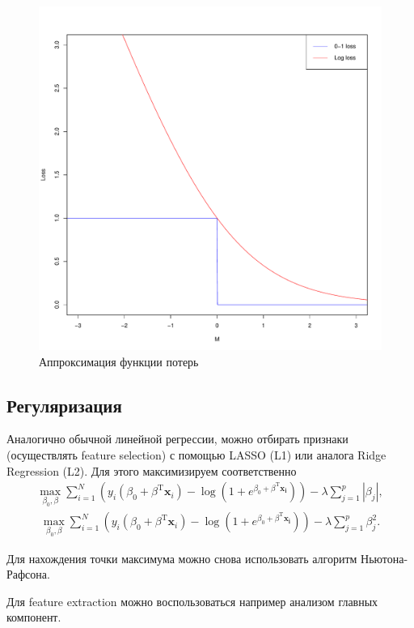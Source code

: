\documentclass{article}
\begin{document}
\begin{figure}[h]
  \begin{center}
  \includegraphics[width=0.8\linewidth]{LogLoss.pdf}
\end{center}
  \caption{Аппроксимация функции потерь}
  \label{fig:LogLoss}
\end{figure}

\subsection{Регуляризация}
Аналогично обычной линейной регрессии, можно отбирать признаки (осуществлять feature selection) с помощью LASSO (L1) или аналога Ridge Regression (L2). Для этого максимизируем соответственно
\begin{align*}
  \max_{\beta_0, \beta} \sum\limits_{i = 1}^N \left( y_i(\beta_0 + \beta^\mathrm{T}\mathbf{x}_i) - \log (1 + e^{\beta_0 + \beta^\mathrm{T}\mathbf{x_i}})\right) - \lambda \sum\limits_{j = 1}^p |\beta_j|,
\end{align*}
\begin{align*}
\max_{\beta_0, \beta} \sum\limits_{i = 1}^N \left( y_i(\beta_0 + \beta^\mathrm{T}\mathbf{x}_i) - \log (1 + e^{\beta_0 + \beta^\mathrm{T}\mathbf{x_i}})\right) - \lambda \sum\limits_{j = 1}^p \beta_j^2.
\end{align*}

Для нахождения точки максимума можно снова использовать алгоритм Ньютона-Рафсона.

Для feature extraction можно воспользоваться например анализом главных компонент.
\end{document}
